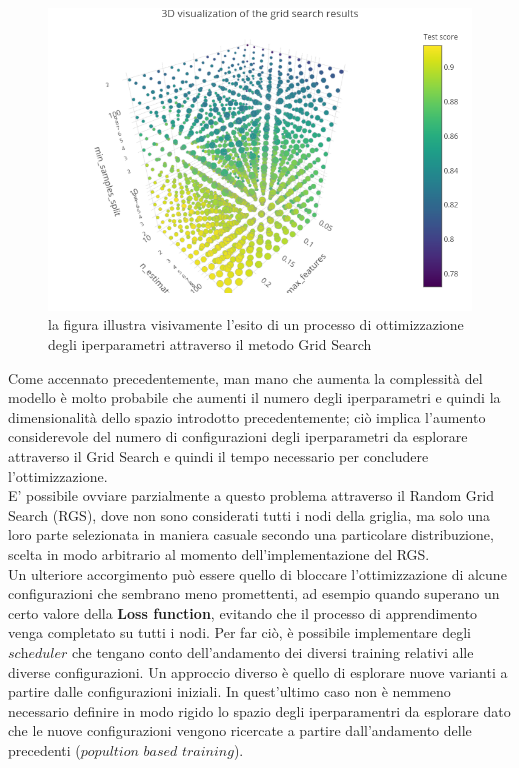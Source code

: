 \begin{figure}[h!]
	\includegraphics[width=\linewidth]{figs/Grid_immagine.png}
	\caption{la figura illustra visivamente l'esito di un processo di ottimizzazione degli iperparametri attraverso il metodo Grid Search \cite{knuthwebsite}}
	\label{fig:Grid Search}
\end{figure}
\newpage 

Come accennato precedentemente, man mano che aumenta la complessità del modello è molto probabile che aumenti il numero degli iperparametri e quindi la dimensionalità dello spazio introdotto precedentemente; ciò implica l'aumento considerevole del numero di configurazioni degli iperparametri da esplorare attraverso il Grid Search e quindi il tempo necessario per concludere l'ottimizzazione.\\
E' possibile ovviare parzialmente a questo problema attraverso il Random Grid Search (RGS), dove non sono considerati tutti i nodi della griglia, ma solo una loro parte selezionata in maniera casuale secondo una particolare distribuzione, scelta in modo arbitrario al momento dell'implementazione del RGS. \\
Un ulteriore accorgimento può  essere quello di bloccare l'ottimizzazione di alcune configurazioni che sembrano meno promettenti, ad esempio quando superano un certo valore della \textbf{Loss function}, evitando che il processo di apprendimento venga completato su tutti i nodi. Per far ciò, è possibile implementare degli $\textit{scheduler}$ che tengano conto dell'andamento dei diversi training relativi alle diverse configurazioni. Un approccio diverso è quello di esplorare nuove varianti a partire dalle configurazioni iniziali. In quest'ultimo caso non è nemmeno necessario definire in modo rigido lo spazio degli iperparamentri da esplorare dato che le nuove configurazioni vengono ricercate a partire dall'andamento delle precedenti ($\textit{popultion based training}$).

